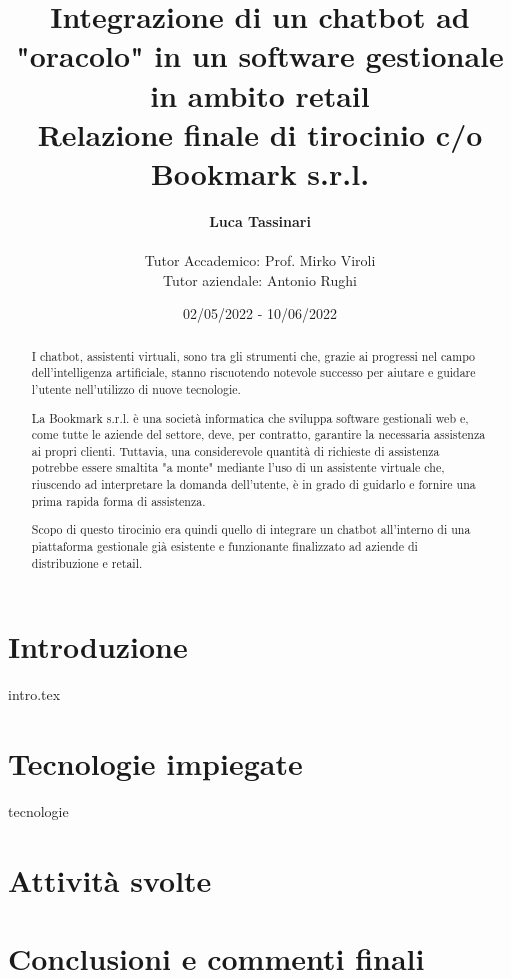 \documentclass[a4paper,twoside,11pt]{report}
\title{
	Integrazione di un chatbot ad "oracolo" in un software gestionale in ambito  retail \\
	\large Relazione finale di tirocinio c/o Bookmark s.r.l.
}
\author{
	\textbf{Luca Tassinari} \\\\
	Tutor Accademico: Prof. Mirko Viroli \\
	Tutor aziendale: Antonio Rughi
}
\date{02/05/2022 - 10/06/2022}
\begin{document}
\maketitle

\begin{abstract}
I chatbot, assistenti virtuali, sono tra gli strumenti che, grazie ai progressi nel campo dell'intelligenza artificiale, stanno riscuotendo notevole successo per aiutare e guidare l'utente nell'utilizzo di nuove tecnologie.

La Bookmark s.r.l. è una società informatica che sviluppa software gestionali web e, come tutte le aziende del settore, deve, per contratto, garantire la necessaria assistenza ai propri clienti. 
%
Tuttavia, una considerevole quantità di richieste di assistenza potrebbe essere smaltita "a monte" mediante l'uso di un assistente virtuale che, riuscendo ad interpretare la domanda dell'utente, è in grado di guidarlo e fornire una prima rapida forma di assistenza.

Scopo di questo tirocinio era quindi quello di integrare un chatbot all'interno di una piattaforma gestionale già esistente e funzionante finalizzato ad aziende di distribuzione e retail.
\end{abstract}

\tableofcontents

\chapter[Introduzione]{Introduzione}
{intro.tex}

\chapter[Tecnologie]{Tecnologie impiegate}
{tecnologie}

\chapter[Attività]{Attività svolte}

\chapter[Conclusioni]{Conclusioni e commenti finali}



\end{document}
